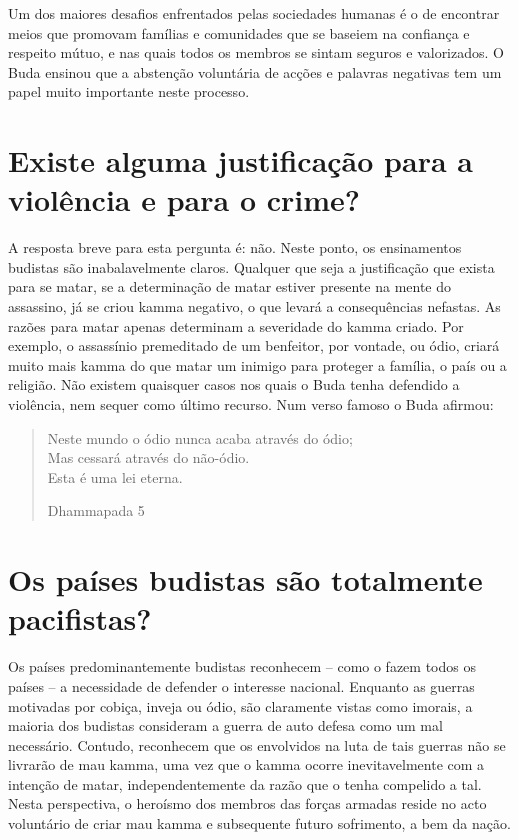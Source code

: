 Um dos maiores desafios enfrentados pelas sociedades humanas é o de
encontrar meios que promovam famílias e comunidades que se baseiem na
confiança e respeito mútuo, e nas quais todos os membros se sintam
seguros e valorizados. O Buda ensinou que a abstenção voluntária de
acções e palavras negativas tem um papel muito importante neste
processo.

\section{Existe alguma justificação para a violência e para o crime?}

A resposta breve para esta pergunta é: não. Neste ponto, os ensinamentos
budistas são inabalavelmente claros. Qualquer que seja a justificação
que exista para se matar, se a determinação de matar estiver presente na
mente do assassino, já se criou kamma negativo, o que levará a
consequências nefastas. As razões para matar apenas determinam a
severidade do kamma criado. Por exemplo, o assassínio premeditado de um
benfeitor, por vontade, ou ódio, criará muito mais kamma do que matar
um inimigo para proteger a família, o país ou a religião. Não existem
quaisquer casos nos quais o Buda tenha defendido a violência, nem sequer
como último recurso. Num verso famoso o Buda afirmou:

\begin{verse}
  Neste mundo o ódio nunca acaba através do ódio;\\
  Mas cessará através do não-ódio.\\
  Esta é uma lei eterna.

  Dhammapada 5
\end{verse}

\section{Os países budistas são totalmente pacifistas?}

Os países predominantemente budistas reconhecem -- como o fazem todos os
países -- a necessidade de defender o interesse nacional. Enquanto as
guerras motivadas por cobiça, inveja ou ódio, são claramente vistas como
imorais, a maioria dos budistas consideram a guerra de auto defesa como
um mal necessário. Contudo, reconhecem que os envolvidos na luta de tais
guerras não se livrarão de mau kamma, uma vez que o kamma ocorre
inevitavelmente com a intenção de matar, independentemente da razão que
o tenha compelido a tal. Nesta perspectiva, o heroísmo dos membros das
forças armadas reside no acto voluntário de criar mau kamma e
subsequente futuro sofrimento, a bem da nação.

